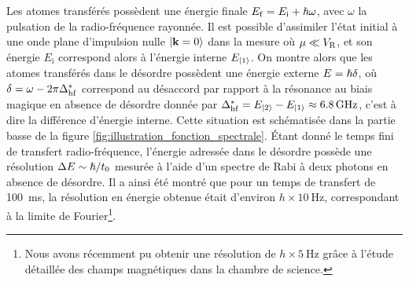 Les atomes transférés possèdent une énergie finale $E_{\mathrm{f}}=E_{\mathrm{i}} +\hslash\omega$, avec $\omega$ la pulsation de la radio-fréquence rayonnée. Il est possible d'assimiler l'état initial à une onde plane d'impulsion nulle $\left| \mathbf{k}=0 \right\rangle$ dans la mesure où $\mu\ll V_{\mathrm{R}}$, et son énergie $E_{\mathrm{i}}$ correspond alors à l'énergie interne $E_{\left| 1 \right\rangle}$. On montre alors que les atomes transférés dans le désordre possèdent une énergie externe $E=\hslash\delta$, où $\delta=\omega-2\pi \Delta_{\mathrm{hf}}^*$ correspond au désaccord par rapport à la résonance au biais magique en absence de désordre donnée par $\Delta_{\mathrm{hf}}^*=E_{\left| 2 \right\rangle}-E_{\left| 1 \right\rangle}\approx \SI{6.8}{\giga\hertz}$, c'est à dire la différence d'énergie interne. Cette situation est schématisée dans la partie basse de la figure \ref{fig:illustration_fonction_spectrale}. Étant donné le temps fini de transfert radio-fréquence, l'énergie adressée dans le désordre possède une résolution $\Delta E\sim \hslash/t_0$ mesurée à l'aide d'un spectre de Rabi à deux photons en absence de désordre. Il a ainsi été montré que pour un temps de transfert de \SI{100}{\milli\second}, la résolution en énergie obtenue était d'environ $h\times\SI{10}{\hertz}$, correspondant à la limite de Fourier\footnote{Nous avons récemment pu obtenir une résolution de $h\times\SI{5}{\hertz}$ grâce à l'étude détaillée des champs magnétiques dans la chambre de science.}. 









